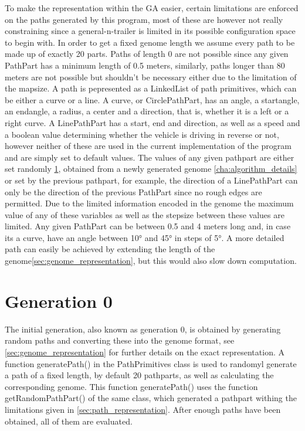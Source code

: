 To make the representation within the GA easier, certain limitations are enforced on the paths generated by this program, most of these are however not really constraining since a general-n-trailer is limited in its possible configuration space to begin with. In order to get a fixed genome length we assume every path to be made up of exactly 20 parts. Paths of length 0 are not possible since any given PathPart has a minimum length of 0.5 meters, similarly, paths longer than 80 meters are not possible but shouldn't be necessary either due to the limitation of the mapsize.
A path is pepresented as a LinkedList of path primitives, which can be either a curve or a line. A curve, or CirclePathPart, has an angle, a startangle, an endangle, a radius, a center and a direction, that is, whether it is a left or a right curve. A LinePathPart has a start, end and direction, as well as a speed and a boolean value determining whether the vehicle is driving in reverse or not, however neither of these are used in the current implementation of the program and are simply set to default values. The values of any given pathpart are either set randomly \ref{sec:generation_0}, obtained from a newly generated genome \ref{cha:algorithm_details} or set by the previous pathpart, for example, the direction of a LinePathPart can only be the direction of the previous PathPart since no rough edges are permitted.
Due to the limited information encoded in the genome the maximum value of any of these variables as well as the stepsize between these values are limited. Any given PathPart can be between 0.5 and 4 meters long and, in case its a curve, have an angle between 10° and 45° in steps of 5°. A more detailed path can easily be achieved by extending the length of the genome\ref{sec:genome_representation}, but this would also slow down computation.

\section{Generation 0} %
\label{sec:generation_0}

The initial generation, also known as generation 0, is obtained by generating random paths and converting these into the genome format, see \ref{sec:genome_representation} for further details on the exact representation. A function generatePath() in the PathPrimitives class is used to randomyl generate a path of a fixed length, by default 20 pathparts, as well as calculating the corresponding genome. This function generatePath() uses the function getRandomPathPart() of the same class, which generated a pathpart withing the limitations given in \ref{sec:path_representation}.
After enough paths have been obtained, all of them are evaluated.

